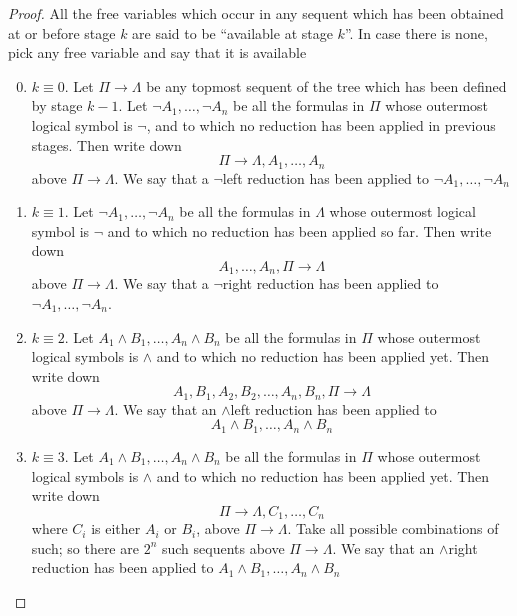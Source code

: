 \documentclass[11pt]{article}
\begin{document}
\begin{proof}
All the free variables which occur in any sequent which has been obtained at or before
stage \(k\) are said to be ``available at stage \(k\)''. In case there is none, pick any free
variable and say that it is available
\begin{enumerate}
\setcounter{enumi}{-1}
\item \(k\equiv 0\). Let \(\Pi\to\Lambda\) be any topmost sequent of the tree which has been defined
by stage \(k-1\). Let \(\neg A_1,\dots,\neg A_n\) be all the formulas in \(\Pi\) whose outermost logical
symbol is \(\neg\), and to which no reduction has been applied in previous stages. Then write
down
\begin{equation*}
\Pi\to\Lambda,A_1,\dots,A_n
\end{equation*}
above \(\Pi\to\Lambda\). We say that a \(\neg\)left reduction has been applied
to \(\neg A_1,\dots,\neg A_n\)
\item \(k\equiv1\). Let \(\neg A_1,\dots,\neg A_n\) be all the formulas in \(\Lambda\) whose outermost logical
symbol is \(\neg\) and to which no reduction has been applied so far. Then write down
\begin{equation*}
A_1,\dots,A_n,\Pi\to\Lambda
\end{equation*}
above \(\Pi\to\Lambda\). We say that a \(\neg\)right reduction has been applied
to \(\neg A_1,\dots,\neg A_n\).
\item \(k\equiv2\). Let \(A_1\wedge B_1,\dots,A_n\wedge B_n\) be all the formulas in \(\Pi\) whose
outermost logical symbols is \(\wedge\) and to which no reduction has been applied yet. Then
write down
\begin{equation*}
A_1,B_1,A_2,B_2,\dots,A_n,B_n,\Pi\to\Lambda
\end{equation*}
above \(\Pi\to\Lambda\). We say that an \(\wedge\)left reduction has been applied to
\begin{equation*}
A_1\wedge B_1,\dots,A_n\wedge B_n
\end{equation*}
\item \(k\equiv3\). Let \(A_1\wedge B_1,\dots,A_n\wedge B_n\) be all the formulas in \(\Pi\) whose
outermost logical symbols is \(\wedge\) and to which no reduction has been applied yet. Then
write down
\begin{equation*}
\Pi\to\Lambda, C_1,\dots,C_n
\end{equation*}
where \(C_i\) is either \(A_i\) or \(B_i\), above \(\Pi\to\Lambda\). Take all possible
combinations of such; so there are \(2^n\) such sequents above \(\Pi\to\Lambda\). We say that
an \(\wedge\)right reduction has been applied to \(A_1\wedge B_1,\dots,A_n\wedge B_n\)

\end{enumerate}
\end{proof}
\end{document}
